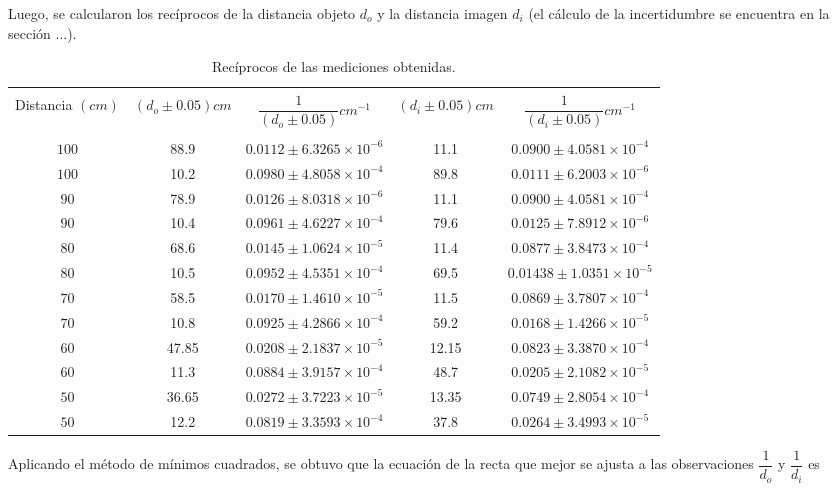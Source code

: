 \documentclass[a4paper, 10pt]{article}
\begin{document}
	Luego, se calcularon los recíprocos de la distancia objeto $d_o$ y la distancia imagen $d_i$ (el cálculo de la incertidumbre se encuentra en la sección ...).
	\begin{table}[ht]
	\centering
	\caption{Recíprocos de las mediciones obtenidas.}		
		\begin{tabular}{|c|c|c|c|c|}
			\hline & & & &\\
			Distancia $(cm)$ & $(d_o \pm 0.05) cm$ & $\dfrac{1}{(d_o \pm 0.05)} cm^{-1}$ & $(d_i \pm 0.05) cm$ & $\dfrac{1}{(d_i \pm 0.05)} cm^{-1}$ \\ & & & &\\
			\hline
			$100$ & 88.9 & $0.0112\pm6.3265\times10^{-6}$ & 11.1 & $0.0900\pm4.0581\times10^{-4}$ \\
			\hline
			$100$ & 10.2 & $0.0980\pm4.8058\times10^{-4}$ & 89.8 & $0.0111\pm6.2003\times10^{-6}$ \\
			\hline
			$90$ & 78.9 & $0.0126\pm8.0318\times10^{-6}$ & 11.1 & $0.0900\pm4.0581\times10^{-4}$ \\
			\hline
			$90$ & 10.4 & $0.0961\pm4.6227\times10^{-4}$ & 79.6 & $0.0125\pm7.8912\times10^{-6}$ \\
			\hline
			$80$ & 68.6 & $0.0145\pm1.0624\times10^{-5}$ & 11.4 & $0.0877\pm3.8473\times10^{-4}$ \\
			\hline
			$80$ & 10.5 & $0.0952\pm4.5351\times10^{-4}$ & 69.5 & $0.01438\pm1.0351\times10^{-5}$ \\
			\hline
			$70$ & 58.5 & $0.0170\pm1.4610\times10^{-5}$ & 11.5 & $0.0869\pm3.7807\times10^{-4}$ \\
			\hline
			$70$ & 10.8 & $0.0925\pm4.2866\times10^{-4}$ & 59.2 & $0.0168\pm1.4266\times10^{-5}$ \\
			\hline
			$60$ & 47.85 & $0.0208\pm2.1837\times10^{-5}$ & 12.15 & $0.0823\pm3.3870\times10^{-4}$ \\
			\hline
			$60$ & 11.3 & $0.0884\pm3.9157\times10^{-4}$ & 48.7 & $0.0205\pm2.1082\times10^{-5}$ \\
			\hline
			$50$ & 36.65 & $0.0272\pm3.7223\times10^{-5}$ & 13.35 & $0.0749\pm2.8054\times10^{-4}$ \\
			\hline
			$50$ & 12.2 & $0.0819\pm3.3593\times10^{-4}$ & 37.8 & $0.0264\pm3.4993\times10^{-5}$ \\
			\hline
		\end{tabular}
	\end{table}
	\newpage
	Aplicando el método de mínimos cuadrados, se obtuvo que la ecuación de la recta que mejor se ajusta a las observaciones $\dfrac{1}{d_o}$ y $\dfrac{1}{d_i}$ es
	
\end{document}
